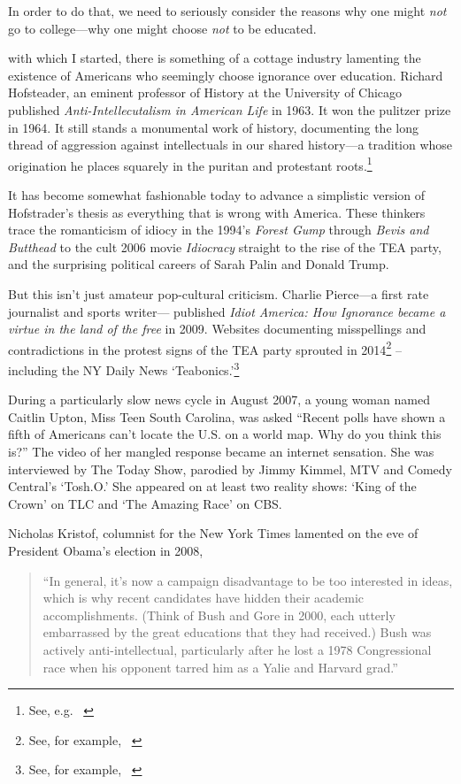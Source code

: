 In order to do that, we need to seriously consider the reasons why one might \emph{not} go to college---why one might choose \emph{not} to be educated. 

 with which I started, there is something of a cottage industry lamenting the existence of Americans who seemingly choose ignorance over education. Richard Hofsteader, an eminent professor of History at the University of Chicago published \emph{Anti-Intellecutalism in American Life} in 1963. It won the pulitzer prize in 1964. It still stands a monumental work of history, documenting the long thread of aggression against intellectuals in our shared history---a tradition whose origination he places squarely in the puritan and protestant roots.\footnote{See, e.g. ~\citep[Ch. 3]{Hofstadter:1966td}}

It has become somewhat fashionable today to advance a simplistic version of Hofstrader's thesis as everything that is wrong with America. These thinkers trace the romanticism of idiocy in the 1994's \emph{Forest Gump} through \emph{Bevis and Butthead} to the cult 2006 movie \emph{Idiocracy} straight to the rise of the TEA party, and the surprising political careers of Sarah Palin and Donald Trump.

But this isn't just amateur pop-cultural criticism. Charlie Pierce---a first rate journalist and sports writer--- published \emph{Idiot America: How Ignorance became a virtue in the land of the free} in 2009. Websites documenting misspellings and contradictions in the protest signs of the TEA party sprouted in 2014\footnote{See, for example, ~\citep{Willis:UQqiO4uq}} -- including the NY Daily News `Teabonics.'\footnote{See, for example, ~\citep{Sloame:ABEzeZ_5}} 

During a particularly slow news cycle in August 2007, a young woman named Caitlin Upton, Miss Teen South Carolina, was asked ``Recent polls have shown a fifth of Americans can't locate the U.S. on a world map. Why do you think this is?'' The video of her mangled response became an internet sensation. She was interviewed by The Today Show, parodied by Jimmy Kimmel, MTV and Comedy Central's `Tosh.O.' She appeared on at least two reality shows: `King of the Crown' on TLC and `The Amazing Race' on CBS.

Nicholas Kristof, columnist for the New York Times lamented on the eve of President Obama's election in 2008, 

\begin{quote}

``In general, it's now a campaign disadvantage to be too interested in ideas, which is why recent candidates have hidden their academic accomplishments. (Think of Bush and Gore in 2000, each utterly embarrassed by the great educations that they had received.) Bush was actively anti-intellectual, particularly after he lost a 1978 Congressional race when his opponent tarred him as a Yalie and Harvard grad.''
\end{quote}

